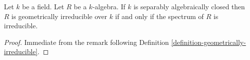 \begin{lemma}
\label{lemma-separably-closed-irreducible-implies-geometric}
Let $k$ be a field.
Let $R$ be a $k$-algebra.
If $k$ is separably algebraically closed then $R$ is
geometrically irreducible over $k$ if and only if the
spectrum of $R$ is irreducible.
\end{lemma}

\begin{proof}
Immediate from the remark following
Definition \ref{definition-geometrically-irreducible}.
\end{proof}